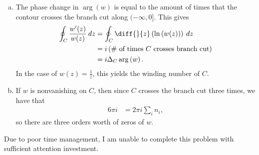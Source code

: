 \documentclass[10pt]{mypackage}
\begin{document}
\begin{solution}[21.33]\hfill
  \begin{enumerate}[(a)]
    \item The phase change in $\arg(w)$ is equal to the amount of times that the contour crosses the branch cut along $(-\infty,0]$. This gives
    \begin{align*}
      \oint_{C}\frac{w'(z)}{w(z)}\:dz &= \oint_{C}\diff{}{z}\left( \ln\left( w(z) \right) \right)\:dz\\
                                      &= i\left( \text{\# of times $C$ crosses branch cut} \right)\\
                                      &= i\Delta_{C}\arg\left( w \right).
    \end{align*}
    In the case of $w(z) = \frac{1}{z}$, this yields the winding number of $C$.
    \item If $w$ is nonvanishing on $C$, then since $C$ crosses the branch cut three times, we have that
      \begin{align*}
        6\pi i &= 2\pi i \sum_{i}n_i,
      \end{align*}
      so there are three orders worth of zeros of $w$.
  \end{enumerate}
\end{solution}
\begin{solution}[22.7]
  Due to poor time management, I am unable to complete this problem with sufficient attention investment.
\end{solution}
\end{document}
